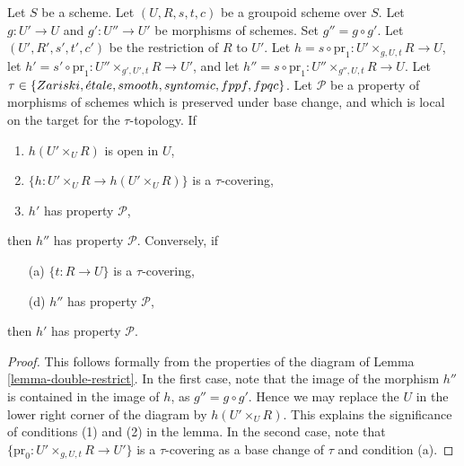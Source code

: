 \begin{lemma}
\label{lemma-double-restrict-property}
Let $S$ be a scheme.
Let $(U, R, s, t, c)$ be a groupoid scheme over $S$.
Let $g : U' \to U$ and $g' : U'' \to U'$ be morphisms of schemes.
Set $g'' = g \circ g'$.
Let $(U', R', s', t', c')$ be the restriction of $R$ to $U'$.
Let $h = s \circ \text{pr}_1 : U' \times_{g, U, t} R \to U$,
let $h' = s' \circ \text{pr}_1 : U'' \times_{g', U', t} R \to U'$, and
let $h'' = s \circ \text{pr}_1 : U'' \times_{g'', U, t} R \to U$.
Let $\tau \in \{Zariski,\linebreak[0] \acute{e}tale,\linebreak[0]
smooth,\linebreak[0] syntomic,\linebreak[0] fppf,\linebreak[0] fpqc\}$. Let
$\mathcal{P}$ be a property of morphisms of schemes
which is preserved under base change, and which
is local on the target for the $\tau$-topology. If
\begin{enumerate}
\item $h(U' \times_U R)$ is open in $U$,
\item $\{h : U' \times_U R \to h(U' \times_U R)\}$ is a $\tau$-covering,
\item $h'$ has property $\mathcal{P}$,
\end{enumerate}
then $h''$ has property $\mathcal{P}$. Conversely, if
\begin{enumerate}
\item[(a)] $\{t : R \to U\}$ is a $\tau$-covering,
\item[(d)] $h''$ has property $\mathcal{P}$,
\end{enumerate}
then $h'$ has property $\mathcal{P}$.
\end{lemma}

\begin{proof}
This follows formally from the properties of the diagram of
Lemma \ref{lemma-double-restrict}.
In the first case, note that the image of the morphism
$h''$ is contained in the image of $h$, as $g'' = g \circ g'$.
Hence we may replace the $U$ in the lower right corner of the
diagram by $h(U' \times_U R)$. This explains the significance of
conditions (1) and (2) in the lemma. In the second case, note that
$\{\text{pr}_0 : U' \times_{g, U, t} R \to U'\}$ is a $\tau$-covering
as a base change of $\tau$ and condition (a).
\end{proof}






